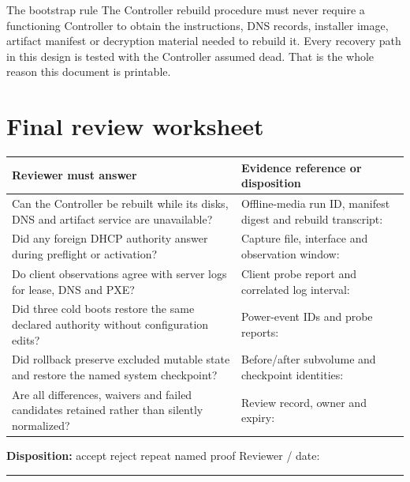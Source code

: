 \begin{gate}{The bootstrap rule}
The Controller rebuild procedure must never require a functioning Controller to
obtain the instructions, DNS records, installer image, artifact manifest or
decryption material needed to rebuild it. Every recovery path in this design is
tested with the Controller assumed dead. That is the whole reason this document
is printable.
\end{gate}

\section{Final review worksheet}
\begin{tabularx}{\linewidth}{@{}p{.32\linewidth}L@{}}
\toprule
\textbf{Reviewer must answer} & \textbf{Evidence reference or disposition}\\
\midrule
Can the Controller be rebuilt while its disks, DNS and artifact service are unavailable? & Offline-media run ID, manifest digest and rebuild transcript:\\[3em]
Did any foreign DHCP authority answer during preflight or activation? & Capture file, interface and observation window:\\[3em]
Do client observations agree with server logs for lease, DNS and PXE? & Client probe report and correlated log interval:\\[3em]
Did three cold boots restore the same declared authority without configuration edits? & Power-event IDs and probe reports:\\[3em]
Did rollback preserve excluded mutable state and restore the named system checkpoint? & Before/after subvolume and checkpoint identities:\\[3em]
Are all differences, waivers and failed candidates retained rather than silently normalized? & Review record, owner and expiry:\\[3em]
\bottomrule
\end{tabularx}

\textbf{Disposition:}\quad
\fbox{\rule{0pt}{.8ex}\rule{.8ex}{0pt}} accept \qquad
\fbox{\rule{0pt}{.8ex}\rule{.8ex}{0pt}} reject \qquad
\fbox{\rule{0pt}{.8ex}\rule{.8ex}{0pt}} repeat named proof
\hfill Reviewer / date:\ \rule{3.1cm}{.4pt}


